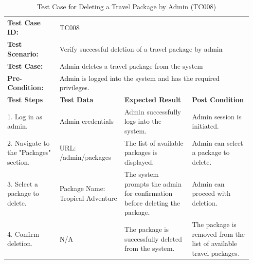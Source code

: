 \documentclass{scrreprt}
\begin{document}
    \begin{longtable}{| m{2cm} | m{5cm} | m{4cm} | m{3cm} |}
    \caption{Test Case for Deleting a Travel Package by Admin (TC008)}
    \vspace{0.5cm} \\ \hline
    \textbf{Test Case ID:} & \multicolumn{3}{l|}{TC008} \\ \hline
    \textbf{Test Scenario:} & \multicolumn{3}{l|}{Verify successful deletion of a travel package by admin} \\ \hline
    \textbf{Test Case:} & \multicolumn{3}{l|}{Admin deletes a travel package from the system} \\ \hline
    \textbf{Pre-Condition:} & \multicolumn{3}{l|}{Admin is logged into the system and has the required privileges.} \\ \hline
    \textbf{Test Steps} & \textbf{Test Data} & \textbf{Expected Result} & \textbf{Post Condition} \\ \hline
    1. Log in as admin. & Admin credentials & Admin successfully logs into the system. & Admin session is initiated. \\ \hline
    2. Navigate to the "Packages" section. & URL: /admin/packages & The list of available packages is displayed. & Admin can select a package to delete. \\ \hline
    3. Select a package to delete. & Package Name: Tropical Adventure & The system prompts the admin for confirmation before deleting the package. & Admin can proceed with deletion. \\ \hline
    4. Confirm deletion. & N/A & The package is successfully deleted from the system. & The package is removed from the list of available travel packages. \\ \hline
    \end{longtable}
    
    \vspace{1cm}
    
\end{document}
